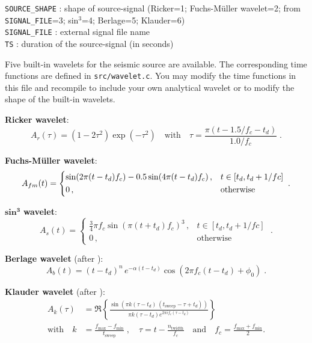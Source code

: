 \texttt{SOURCE\_SHAPE} : shape of source-signal (Ricker=1; Fuchs-M\"uller wavelet=2; from \texttt{SIGNAL\_FILE}=3; sin$^3$=4; Berlage=5; Klauder=6)\\
\texttt{SIGNAL\_FILE} : external signal file name\\
\texttt{TS} : duration of the source-signal (in seconds)

Five built-in wavelets for the seismic source are available. The corresponding time functions are defined in \texttt{src/wavelet.c}. You may modify the time functions in this file and recompile to include your own analytical wavelet or to modify the shape of the built-in wavelets.

\textbf{Ricker wavelet}:
\begin{equation}
    A_r(\tau)= \left(1-2\tau^2\right)\exp(- \tau^2) \quad \mbox{with} \quad \tau=\frac{\pi(t-1.5/f_c-t_d)}{1.0/f_c}\;. 
    \label{eq_ricker}
\end{equation}

\textbf{Fuchs-M\"uller wavelet}:
\begin{equation}
    A_{fm}(t) = \begin{dcases} \sin(2\pi(t-t_d)f_c)-0.5\sin(4\pi(t-t_d)f_c)\,, & t\in[t_d,t_d+1/fc] \\
                 0\,, & \text{otherwise} \end{dcases}\;.
    \label{eq_fm}
\end{equation}

$\mathbf{sin^3}$ \textbf{wavelet}:
\begin{equation}
    A_{s}(t)=\begin{cases} \frac{3}{4} \pi f_c \sin(\pi(t+t_d)f_c)^3\,, & t \in[t_d,t_d+1/fc]\\
           0\,, & \text{otherwise} \end{cases}\;.
\label{eq_s3}
\end{equation}

\textbf{Berlage wavelet} (after \cite{aldrige:90}):
\begin{equation}
    A_b(t)=(t-t_d)^n\,e^{-\alpha (t-t_d)} \cos(2 \pi f_c (t-t_d) + \phi_0)\;.
    \label{eq_berlage}
\end{equation}

\textbf{Klauder wavelet} (after \cite{neelima:18}):
\begin{equation}
\begin{split} A_k(\tau) &= \Re \left\{ \frac{\sin\left(\pi k(\tau-t_d)\,(t_\text{sweep}-\tau+t_d)\right)}{ \pi k (\tau-t_d) e^{2 \pi i f_c (\tau-t_d)} } \right\} \\
\mbox{with} \quad k &= \frac{f_\text{max}-f_\text{min}}{t_\text{sweep}}\;,\quad\tau = t-\frac{n_\text{twidth}}{f_c}\quad\text{and}\quad f_c=\frac{f_\text{max}+f_\text{min}}{2}.\end{split}
    \label{eq_klauder}
\end{equation}

